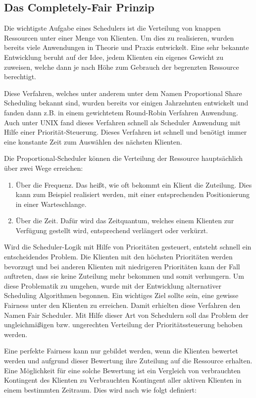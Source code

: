\subsection{Das \glqq Completely-Fair\grqq{} Prinzip}\label{s:fair}
Die wichtigste Aufgabe eines Schedulers ist die Verteilung von knappen Ressourcen unter einer Menge von Klienten. 
Um dies zu realisieren, wurden bereits viele Anwendungen in Theorie und Praxis entwickelt.
Eine sehr bekannte Entwicklung beruht auf der Idee, jedem Klienten ein eigenes Gewicht zu zuweisen, welche dann je nach Höhe zum Gebrauch der begrenzten Ressource berechtigt.

Diese Verfahren, welches unter anderem unter dem Namen \glqq Proportional Share Scheduling\grqq{} bekannt sind, wurden bereits vor einigen Jahrzehnten entwickelt und fanden dann z.B. in einem gewichtetem Round-Robin Verfahren Anwendung. Auch unter UNIX fand dieses Verfahren schnell als Scheduler Anwendung mit Hilfe einer Priorität-Steuer\-ung. Dieses Verfahren ist schnell und benötigt immer eine konstante Zeit zum Auswählen des nächsten Klienten. 

Die Proportional-Scheduler können die Verteilung der Ressource hauptsächlich über zwei Wege erreichen:
\begin{enumerate}
	\item Über die Frequenz. Das heißt, wie oft bekommt ein Klient die Zuteilung. Dies kann zum Beispiel realisiert werden, mit einer entsprechenden Positionierung in einer Warteschlange.
	\item Über die Zeit. Dafür wird das Zeitquantum, welches einem Klienten zur Verfügung gestellt wird, entsprechend verlängert oder verkürzt.
\end{enumerate}

Wird die Scheduler-Logik mit Hilfe von Prioritäten gesteuert, entsteht schnell ein entscheidendes Problem. Die Klienten mit den höchsten Prioritäten werden bevorzugt und bei anderen Klienten mit niedrigeren Prioritäten kann der Fall auftreten, dass sie keine Zuteilung mehr bekommen und somit \glqq verhungern\grqq{}.
Um diese Problematik zu umgehen, wurde mit der Entwicklung alternativer Scheduling Algorithmen begonnen. Ein wichtiges Ziel sollte sein, eine gewisse Fairness unter den Klienten zu erreichen. Damit erhielten diese Verfahren den Namen \glqq Fair Scheduler\grqq{}. Mit Hilfe dieser Art von Schedulern soll das Problem der ungleichmäßigen bzw. ungerechten Verteilung der Prioritätssteuerung behoben werden.

Eine perfekte Fairness kann nur gebildet werden, wenn die Klienten bewertet werden und aufgrund dieser Bewertung ihre Zuteilung auf die Ressource erhalten.
Eine Möglichkeit für eine solche Bewertung ist ein Vergleich von verbrauchten Kontingent des Klienten zu Verbrauchten Kontingent aller aktiven Klienten in einem bestimmten Zeitraum. 
Dies wird nach \cite{usenix} wie folgt definiert:

